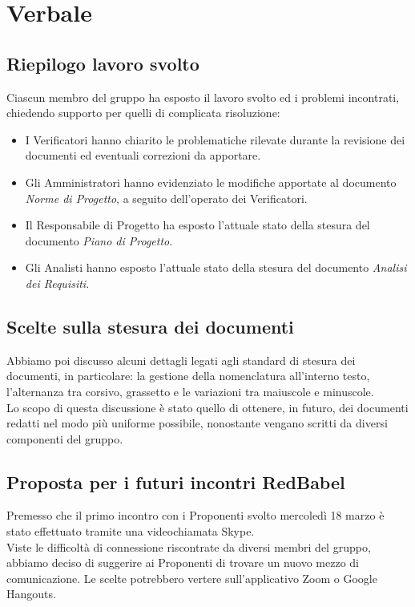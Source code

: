 \section{Verbale}
	
	\subsection{Riepilogo lavoro svolto}
		Ciascun membro del gruppo ha esposto il lavoro svolto ed i problemi incontrati, chiedendo supporto per quelli di complicata risoluzione:
		\begin{itemize}
			\item I Verificatori hanno chiarito le problematiche rilevate durante la revisione dei documenti ed eventuali correzioni da apportare.
			\item Gli Amministratori hanno evidenziato le modifiche apportate al documento \textit{Norme di Progetto}, a seguito dell'operato dei Verificatori.
			\item Il Responsabile di Progetto ha esposto l'attuale stato della stesura del documento \textit{Piano di Progetto}.
			\item Gli Analisti hanno esposto l'attuale stato della stesura del documento \textit{Analisi dei Requisiti}.
		\end{itemize}
		
		
	\subsection{Scelte sulla stesura dei documenti}
		Abbiamo poi discusso alcuni dettagli legati agli standard di stesura dei documenti, in particolare: la gestione della nomenclatura all'interno testo, l'alternanza tra corsivo, grassetto e le variazioni tra maiuscole e minuscole.\\
		Lo scopo di questa discussione è stato quello di ottenere, in futuro, dei documenti redatti nel modo più uniforme possibile, nonostante vengano scritti da diversi componenti del gruppo.
		
		
	\subsection{Proposta per i futuri incontri RedBabel}
		Premesso che il primo incontro con i Proponenti svolto mercoledì 18 marzo è stato effettuato tramite una videochiamata Skype.\\
		Viste le difficoltà di connessione riscontrate da diversi membri del gruppo, abbiamo deciso di suggerire ai Proponenti di trovare un nuovo mezzo di comunicazione. Le scelte potrebbero vertere sull'applicativo Zoom o Google Hangouts.


